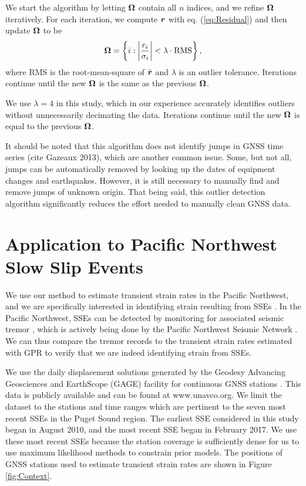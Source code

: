 \documentclass[extra,mreferee]{gji}
\begin{document}
We start the algorithm by letting $\mitbf{\Omega}$ contain all $n$ indices, and we refine $\mitbf{\Omega}$ iteratively. For each iteration, we compute $\mitbf{r}$ with eq. (\ref{eq:Residual}) and then update $\mitbf{\Omega}$ to be
\begin{equation}\label{eq:Update}
\mitbf{\Omega} = \left\{i : \left|\frac{r_i}{\sigma_i}\right| < \lambda \cdot \mathrm{RMS}\right\},
\end{equation} 
where RMS is the root-mean-square of $\tilde{\mitbf{r}}$ and $\lambda$ is an outlier tolerance. Iterations continue until the new $\mitbf{\Omega}$ is the same as the previous $\mitbf{\Omega}$.
 
 
We use $\lambda=4$ in this study, which in our experience accurately identifies outliers without unnecessarily decimating the data. Iterations continue until the new $\mitbf{\Omega}$ is equal to the previous $\mitbf{\Omega}$. 

It should be noted that this algorithm does not identify jumps in GNSS time series (cite Gazeaux 2013), which are another common issue. Some, but not all, jumps can be automatically removed by looking up the dates of equipment changes and earthquakes. However, it is still necessary to manually find and remove jumps of unknown origin. That being said, this outlier detection algorithm significantly reduces the effort needed to manually clean GNSS data.       

\section{Application to Pacific Northwest Slow Slip Events}\label{sec:Cascadia}
We use our method to estimate transient strain rates in the Pacific Northwest, and we are specifically interested in identifying strain resulting from SSEs \citep[e.g.,][]{Dragert2001}. In the Pacific Northwest, SSEs can be detected by monitoring for associated seismic tremor \citep{Rogers2003}, which is actively being done by the Pacific Northwest Seismic Network \citep{Wech2010}. We can thus compare the tremor records to the transient strain rates estimated with GPR to verify that we are indeed identifying strain from SSEs.  

We use the daily displacement solutions generated by the Geodesy Advancing Geosciences and EarthScope (GAGE) facility for continuous GNSS stations \citep{Herring2016}. This data is publicly available and can be found at www.unavco.org. We limit the dataset to the stations and time ranges which are pertinent to the seven most recent SSEs in the Puget Sound region. The earliest SSE considered in this study began in August 2010, and the most recent SSE began in February 2017. We use these most recent SSEs because the station coverage is sufficiently dense for us to use maximum likelihood methods to constrain prior models.  The positions of GNSS stations used to estimate transient strain rates are shown in Figure \ref{fig:Context}.  
\end{document}

